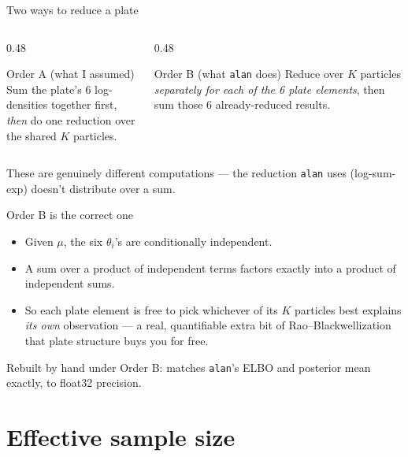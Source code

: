 \documentclass[aspectratio=169]{beamer}
\begin{document}
\begin{frame}{Two ways to reduce a plate}
  \begin{columns}[T]
    \begin{column}{0.48\textwidth}
      \begin{alertblock}{Order A (what I assumed)}
        Sum the plate's 6 log-densities together first, \\
        \emph{then} do one reduction over the shared $K$ particles.
      \end{alertblock}
    \end{column}
    \begin{column}{0.48\textwidth}
      \begin{block}{Order B (what \texttt{alan} does)}
        Reduce over $K$ particles \emph{separately for each of the 6 plate
        elements}, then sum those 6 already-reduced results.
      \end{block}
    \end{column}
  \end{columns}
  \vfill
  These are genuinely different computations --- the reduction \texttt{alan}
  uses (log-sum-exp) doesn't distribute over a sum.
\end{frame}

\begin{frame}{Order B is the correct one}
  \begin{itemize}
    \item Given $\mu$, the six $\theta_i$'s are \alert{conditionally
      independent}.
    \item A sum over a product of independent terms factors exactly into a
      product of independent sums.
    \item So each plate element is free to pick whichever of its $K$
      particles best explains \emph{its own} observation --- a real,
      quantifiable extra bit of Rao--Blackwellization that plate structure
      buys you for free.
  \end{itemize}
  \vfill
  \small Rebuilt by hand under Order B: matches \texttt{alan}'s ELBO and
  posterior mean exactly, to float32 precision.
\end{frame}

\section{Effective sample size}
\end{document}
